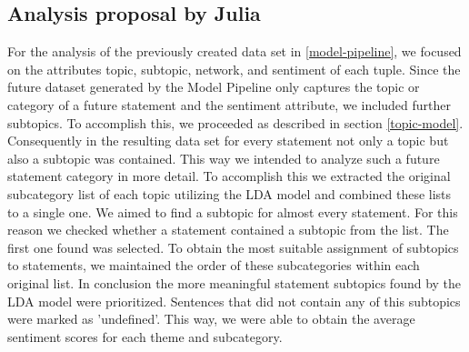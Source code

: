 \subsection{Analysis proposal by Julia}
For the analysis of the previously created data set in \ref{model-pipeline}, we focused on the attributes topic, subtopic, network, and sentiment of each tuple. 
Since the future dataset generated by the Model Pipeline only captures the topic or category of a future statement and the sentiment attribute, we included further subtopics. To accomplish this, we proceeded as described in section \ref{topic-model}. Consequently in the resulting data set for every statement not only a topic but also a subtopic was contained.
This way we intended to analyze such a future statement category in more detail. To accomplish this we extracted the original subcategory list of each topic utilizing the LDA model and combined these lists to a single one. We aimed to find a subtopic for almost every statement. For this reason we checked whether a statement contained a subtopic from the list. The first one found was selected. To obtain the most suitable assignment of subtopics to statements, we maintained the order of these subcategories within each original list. In conclusion the more meaningful statement subtopics found by the LDA model were prioritized. Sentences that did not contain any of this subtopics were marked as 'undefined'. This way, we were able to obtain the average sentiment scores for each theme and subcategory.
